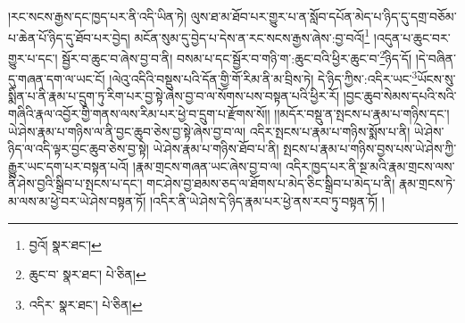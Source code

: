 །རང་སངས་རྒྱས་དང་ཁྱད་པར་ནི་འདི་ཡིན་ཏེ། ལུས་ཐ་མ་ཐོབ་པར་གྱུར་པ་ན་སློབ་དཔོན་མེད་པ་ཉིད་དུ་དགྲ་བཅོམ་པ་ཆེན་པོ་ཉིད་དུ་ཐོབ་པར་བྱེད། མངོན་སུམ་དུ་བྱེད་པ་དེས་ན་རང་སངས་རྒྱས་ཞེས་:བྱ་བའོ།\footnote{བྱའོ།  སྣར་ཐང་། } །འདུན་པ་ཆུང་བར་གྱུར་པ་དང་། སྦྱོར་བ་ཆུང་བ་ཞེས་བྱ་བ་ནི། བསམ་པ་དང་སྦྱོར་བ་གཉི་ག་:ཆུང་བའི་ཕྱིར་ཆུང་བ་\footnote{ཆུང་བ་  སྣར་ཐང་།  པེ་ཅིན། }ཉིད་དོ། །དེ་བཞིན་དུ་གཞན་དག་ལ་ཡང་ངོ། །ལེའུ་འདིའི་བསྡུས་པའི་དོན་གྱི་གོ་རིམ་ནི་མ་བྲིས་ཏེ། དེ་ཉིད་ཀྱིས་:འདིར་ཡང་\footnote{འདིར་  སྣར་ཐང་།  པེ་ཅིན། }ཡོངས་སུ་སྨིན་པ་ནི་རྣམ་པ་དྲུག་ཏུ་རིག་པར་བྱ་སྟེ་ཞེས་བྱ་བ་ལ་སོགས་པས་བསྟན་པའི་ཕྱིར་རོ། །བྱང་ཆུབ་སེམས་དཔའི་སའི་གཞིའི་རྣལ་འབྱོར་གྱི་གནས་ལས་རིམ་པར་ཕྱེ་བ་དྲུག་པ་རྫོགས་སོ།། །།མདོར་བསྡུ་ན་སྤངས་པ་རྣམ་པ་གཉིས་དང་། ཡེ་ཤེས་རྣམ་པ་གཉིས་ལ་ནི་བྱང་ཆུབ་ཅེས་བྱ་སྟེ་ཞེས་བྱ་བ་ལ། འདིར་སྤངས་པ་རྣམ་པ་གཉིས་སྨོས་པ་ནི། ཡེ་ཤེས་ཉིད་ལ་འདི་ལྟར་བྱང་ཆུབ་ཅེས་བྱ་སྟེ། ཡེ་ཤེས་རྣམ་པ་གཉིས་ཐོབ་པ་ནི། སྤངས་པ་རྣམ་པ་གཉིས་བྱས་པས་ཡེ་ཤེས་ཀྱི་རྒྱུར་ཡང་དག་པར་བསྟན་པའོ། །རྣམ་གྲངས་གཞན་ཡང་ཞེས་བྱ་བ་ལ། འདིར་ཁྱད་པར་ནི་སྔ་མའི་རྣམ་གྲངས་ལས་ནི་ཤེས་བྱའི་སྒྲིབ་པ་སྤངས་པ་དང་། གང་ཤེས་བྱ་ཐམས་ཅད་ལ་ཐོགས་པ་མེད་ཅིང་སྒྲིབ་པ་མེད་པ་ནི། རྣམ་གྲངས་ཏེ་མ་ལས་མ་ཕྱེ་བར་ཡེ་ཤེས་བསྟན་ཏོ། །འདིར་ནི་ཡེ་ཤེས་དེ་ཉིད་རྣམ་པར་ཕྱེ་ནས་རབ་ཏུ་བསྟན་ཏོ། །
